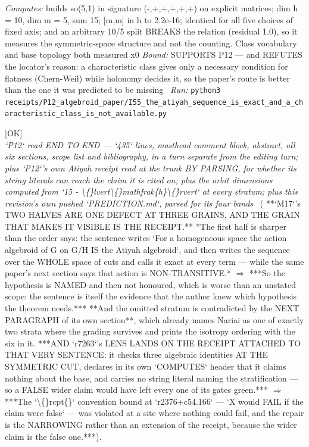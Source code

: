 \begin{description}
\emph{Computes:} builds so(5,1) in signature (-,+,+,+,+,+) on explicit matrices; dim h = 10, dim m = 5, sum 15; [m,m] in h to 2.2e-16; identical for all five choices of fixed axis; and an arbitrary 10/5 split BREAKS the relation (residual 1.0), so it measures the symmetric-space structure and not the counting. Class vocabulary and base topology both measured x0
 \emph{Bound:} SUPPORTS P12 --- and REFUTES the locator's reason: a characteristic class gives only a necessary condition for flatness (Chern-Weil) while holonomy decides it, so the paper's route is better than the one it was predicted to be missing
\ \emph{Run:} \texttt{python3 receipts/P12\_algebroid\_paper/I55\_the\_atiyah\_sequence\_is\_exact\_and\_a\_characteristic\_class\_is\_not\_available.py}
\item[\label{rcpt:S22_the_sentence_over_reached_and_the_receipt_cited_on_it_under_reached_so_the_rcpt_convention_was_violated_at_a_site_where_nothing_could_fail}\textbf{}\quad\texttt{S22\_the\_sentence\_over\_reached\_and\_the\_receipt\_cited\_on\_it\_under\_reached\_so\_the\_rcpt\_convention\_was\_violated\_at\_a\_site\_where\_nothing\_could\_fail}]\hfill\textsf{[OK]}\\
\textit{`P12` read END TO END --- `435` lines, masthead comment block, abstract, all six sections, scope list and bibliography, in a turn separate from the editing turn; plus `P12`'s own Atiyah receipt read at the trunk BY PARSING, for whether its string literals can reach the claim it is cited on; plus the orbit dimensions computed from `15 - \textbackslash\{\}lvert\textbackslash\{\}mathfrak\{h\}\textbackslash\{\}rvert` at every stratum; plus this revision's own pushed `PREDICTION.md`, parsed for its four bands} \ ( **`M17`'s TWO HALVES ARE ONE DEFECT AT THREE GRAINS, AND THE GRAIN THAT MAKES IT VISIBLE IS THE RECEIPT.** *The first half is sharper than the order says: the sentence writes `For a homogeneous space the action algebroid of G on G/H IS the Atiyah algebroid`, and then writes the sequence over the WHOLE space of cuts and calls it exact at every term --- while the same paper's next section says that action is NON-TRANSITIVE.* \ensuremath{\Rightarrow} ***So the hypothesis is NAMED and then not honoured, which is worse than an unstated scope: the sentence is itself the evidence that the author knew which hypothesis the theorem needs.***  **And the omitted stratum is contradicted by the NEXT PARAGRAPH of its own section**, which already names Nariai as one of exactly two strata where the grading survives and prints the isotropy ordering with the six in it.  ***AND `r7263`'s LENS LANDS ON THE RECEIPT ATTACHED TO THAT VERY SENTENCE: it checks three algebraic identities AT THE SYMMETRIC CUT, declares in its own `COMPUTES` header that it claims nothing about the base, and carries no string literal naming the stratification --- so a FALSE wider claim would have left every one of its gates green.*** \ensuremath{\Rightarrow} ***The `\textbackslash\{\}rcpt\{\}` convention bound at `r2376+c54.166` --- `X would FAIL if the claim were false` --- was violated at a site where nothing could fail, and the repair is the NARROWING rather than an extension of the receipt, because the wider claim is the false one.***). 

\end{description}
